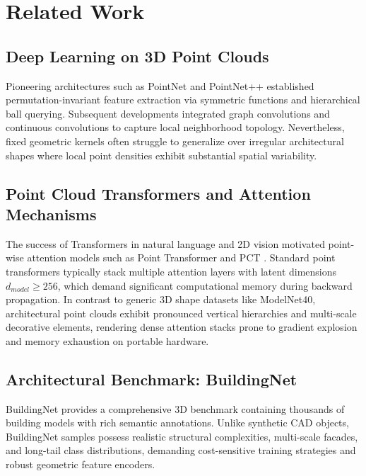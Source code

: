 \section{Related Work}
\label{sec:related_work}

\subsection{Deep Learning on 3D Point Clouds}
Pioneering architectures such as PointNet \cite{qi2017pointnet} and PointNet++ \cite{qi2017pointnetplusplus} established permutation-invariant feature extraction via symmetric functions and hierarchical ball querying. Subsequent developments integrated graph convolutions and continuous convolutions to capture local neighborhood topology. Nevertheless, fixed geometric kernels often struggle to generalize over irregular architectural shapes where local point densities exhibit substantial spatial variability.

\subsection{Point Cloud Transformers and Attention Mechanisms}
The success of Transformers in natural language and 2D vision motivated point-wise attention models such as Point Transformer and PCT \cite{guo2021pct}. Standard point transformers typically stack multiple attention layers with latent dimensions $d_{model} \ge 256$, which demand significant computational memory during backward propagation. In contrast to generic 3D shape datasets like ModelNet40, architectural point clouds exhibit pronounced vertical hierarchies and multi-scale decorative elements, rendering dense attention stacks prone to gradient explosion and memory exhaustion on portable hardware.

\subsection{Architectural Benchmark: BuildingNet}
BuildingNet \cite{buildingnet2021} provides a comprehensive 3D benchmark containing thousands of building models with rich semantic annotations. Unlike synthetic CAD objects, BuildingNet samples possess realistic structural complexities, multi-scale facades, and long-tail class distributions, demanding cost-sensitive training strategies and robust geometric feature encoders.
